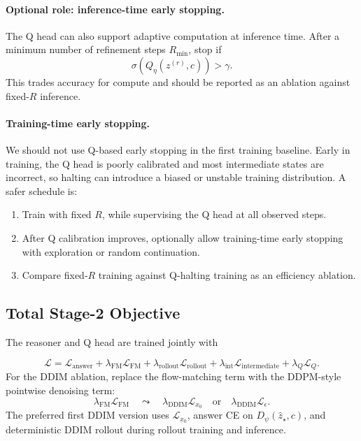 \documentclass[11pt]{article}
\begin{document}
\paragraph{Optional role: inference-time early stopping.}
The Q head can also support adaptive computation at inference time. After a minimum number of refinement steps \(R_{\min}\), stop if
\[
    \sigma(Q_\eta(z^{(r)},c))>\gamma.
\]
This trades accuracy for compute and should be reported as an ablation against fixed-\(R\) inference.

\paragraph{Training-time early stopping.}
We should not use Q-based early stopping in the first training baseline. Early in training, the Q head is poorly calibrated and most intermediate states are incorrect, so halting can introduce a biased or unstable training distribution. A safer schedule is:
\begin{enumerate}[itemsep=0pt]
    \item Train with fixed \(R\), while supervising the Q head at all observed steps.
    \item After Q calibration improves, optionally allow training-time early stopping with exploration or random continuation.
    \item Compare fixed-\(R\) training against Q-halting training as an efficiency ablation.
\end{enumerate}

\subsection{Total Stage-2 Objective}

The reasoner and Q head are trained jointly with

\[
    \mathcal L
    =
    \mathcal L_{\mathrm{answer}}
    +
    \lambda_{\mathrm{FM}}\mathcal L_{\mathrm{FM}}
    +
    \lambda_{\mathrm{rollout}}\mathcal L_{\mathrm{rollout}}
    +
    \lambda_{\mathrm{int}}\mathcal L_{\mathrm{intermediate}}
    +
    \lambda_Q\mathcal L_Q.
\]
For the DDIM ablation, replace the flow-matching term with the DDPM-style pointwise denoising term:
\[
    \lambda_{\mathrm{FM}}\mathcal L_{\mathrm{FM}}
    \quad\leadsto\quad
    \lambda_{\mathrm{DDIM}}\mathcal L_{x_0}
    \quad\text{or}\quad
    \lambda_{\mathrm{DDIM}}\mathcal L_{\epsilon}.
\]
The preferred first DDIM version uses \(\mathcal L_{x_0}\), answer CE on \(D_\psi(\hat z_\star,c)\), and deterministic DDIM rollout during rollout training and inference.
\end{document}
